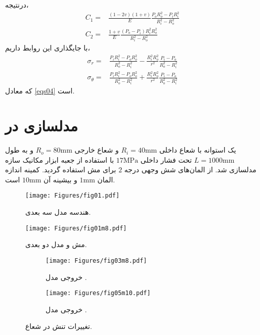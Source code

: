 \documentclass[11pt]{article} %
\begin{document}
درنتیجه،
\begin{equation}\nonumber\begin{aligned}
C_{1}=&\frac{(1-2 v)(1+v)}{E} \frac{P_{o} R_o^{2}-P_{i} R_i^{2}}{R_i^{2}-R_o^{2}}\\
C_{2}=&\frac{1+v}{E} \frac{\left(P_{o}-P_{i}\right) R_i^{2} R_o^{2}}{R_i^{2}-R_o^{2}}
\end{aligned}
\end{equation}
با جایگذاری این روابط داریم،
\begin{equation}\nonumber\begin{aligned}
\sigma_{r}=&\frac{P_{i} R_i^{2}-P_{o} R_o^{2}}{R_o^{2}-R_i^{2}}-\frac{R_i^{2} R_o^{2}}{r^{2}} \frac{P_{i}-P_{o}}{R_o^{2}-R_i^{2}} \\
\sigma_{\theta}=&\frac{P_{i} R_i^{2}-P_{o} R_o^{2}}{R_o^{2}-R_i^{2}}+\frac{R_i^{2} R_o^{2}}{r^{2}} \frac{P_{i}-P_{o}}{R_o^{2}-R_i^{2}}
\end{aligned}
\end{equation}
که معادل \cref{eqs04} است.
\section{مدلسازی در }\label{sec_numm}
یک استوانه با شعاع داخلی 
$R_i=40\mathrm{mm}$
 و شعاع خارجی 
 $R_o=80\mathrm{mm}$
  و به طول 
  $L=1000\mathrm{mm}$
   تحت فشار داخلی 
   $17\mathrm{MPa}$
    با استفاده از جعبه ابزار مکانیک سازه  مدلسازی شد. از المان‌های شش وجهی درجه 
    $2$
     برای مش استفاده گردید. کمینه اندازه المان 
     $1\mathrm{mm}$
      و بیشینه آن 
      $10\mathrm{mm}$
       است.

\begin{figure}\centering
\texttt{[image: Figures/fig01.pdf]}
\caption{هندسه مدل سه بعدی.}\label{fig01}
\end{figure}
\begin{figure}\centering
\texttt{[image: Figures/fig01m8.pdf]}
\caption{مش و مدل دو بعدی.}\label{fig01m}
\end{figure}
\begin{figure}\centering
\begin{subfigure}{\textwidth}\centering
\texttt{[image: Figures/fig03m8.pdf]}
\caption{خروجی مدل .}\label{fig05a}
\end{subfigure}
\begin{subfigure}{\textwidth}\centering
%
\texttt{[image: Figures/fig05m10.pdf]}
\caption{خروجی مدل .}\label{fig05b}
\end{subfigure}
\caption{تغییرات تنش در شعاع.}\label{fig05}
\end{figure}
\end{document}

